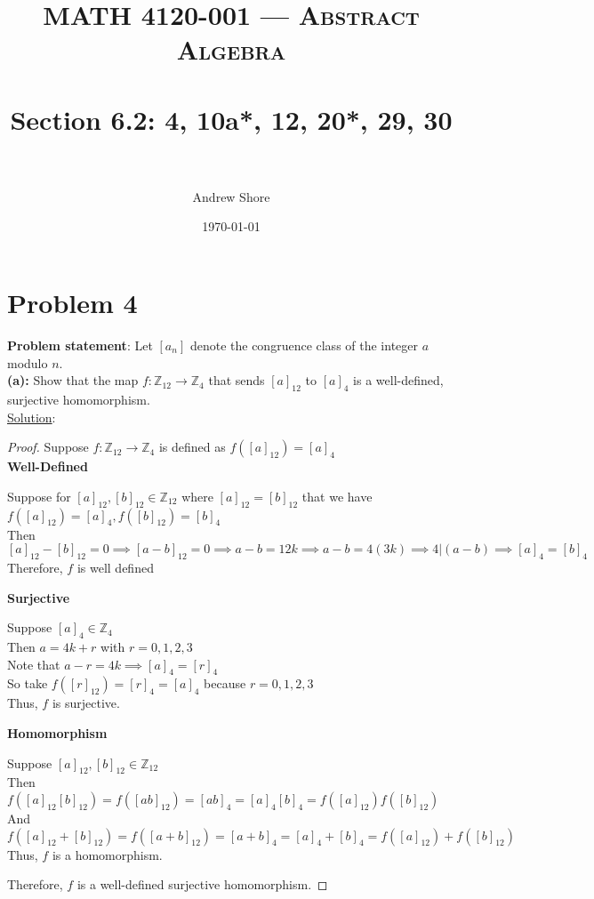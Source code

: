 \documentclass{article} %
\title{ 
\normalfont \normalsize 
\textsc{MATH 4120-001 --- Abstract Algebra} \\
\horrule{0.5pt} \\[0cm] %
\huge Section 6.2:  4, 10a*, 12, 20*, 29, 30\\ %
\horrule{2pt} \\[0cm] %
}
\author{Andrew Shore} %
\date{\normalsize\today} %
\begin{document}
\maketitle %

\section*{Problem 4}


\textbf{Problem statement}: Let $[a_n]$ denote the congruence class of the integer $a$ modulo $n$.
\\
\textbf{(a):} Show that the map $f: \mathbb{Z}_{12} \rightarrow \mathbb{Z}_4$ that sends $[a]_{12}$ to $[a]_4$ is a well-defined, surjective homomorphism.
\\
\underline{Solution}: 
\begin{addmargin}[1em]{0em}
\begin{proof}
Suppose $f: \mathbb{Z}_{12} \rightarrow \mathbb{Z}_4$ is defined as $f([a]_{12}) = [a]_4$
\\ \textbf{Well-Defined}
\begin{addmargin}[1em]{0em}
Suppose for $[a]_{12}, [b]_{12} \in \mathbb{Z}_{12}$ where $[a]_{12} = [b]_{12}$ that we have $f([a]_{12}) = [a]_{4}, f([b]_{12}) = [b]_4$
\\Then $[a]_{12} - [b]_{12} = 0 \implies [a - b]_{12} = 0 \implies a - b = 12k \implies a - b = 4(3k) \implies 4|(a-b) \implies [a]_4 = [b]_4$
\\Therefore, $f$ is well defined
\end{addmargin}
\textbf{Surjective}
\begin{addmargin}[1em]{0em}
Suppose $[a]_4 \in \mathbb{Z}_4$
\\Then $a = 4k + r$ with $r = 0, 1, 2, 3$
\\Note that $a - r = 4k \implies [a]_4 = [r]_4$
\\So take $f([r]_12) = [r]_4 = [a]_4$ because $r = 0, 1, 2, 3$
\\Thus, $f$ is surjective.
\end{addmargin}
\textbf{Homomorphism}
\begin{addmargin}[1em]{0em}
Suppose $[a]_{12}, [b]_{12} \in \mathbb{Z}_{12}$
\\Then $f([a]_{12}[b]_{12}) = f([ab]_{12}) = [ab]_{4} = [a]_4[b]_4 = f([a]_{12})f([b]_{12})$
\\And $f([a]_{12} + [b]_{12}) = f([a + b]_{12}) = [a + b]_4 = [a]_4 + [b]_4 = f([a]_{12}) + f([b]_{12})$
\\Thus, $f$ is a homomorphism.
\end{addmargin}
Therefore, $f$ is a well-defined surjective homomorphism.
\end{proof}
\end{addmargin}
\end{document}
